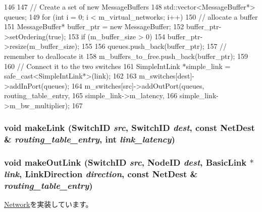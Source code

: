 \begin{DoxyCode}
146 {
147     // Create a set of new MessageBuffers
148     std::vector<MessageBuffer*> queues;
149     for (int i = 0; i < m_virtual_networks; i++) {
150         // allocate a buffer
151         MessageBuffer* buffer_ptr = new MessageBuffer;
152         buffer_ptr->setOrdering(true);
153         if (m_buffer_size > 0) {
154             buffer_ptr->resize(m_buffer_size);
155         }
156         queues.push_back(buffer_ptr);
157         // remember to deallocate it
158         m_buffers_to_free.push_back(buffer_ptr);
159     }
160     // Connect it to the two switches
161     SimpleIntLink *simple_link = safe_cast<SimpleIntLink*>(link);
162 
163     m_switches[dest]->addInPort(queues);
164     m_switches[src]->addOutPort(queues, routing_table_entry,
165                                          simple_link->m_latency, 
166                                          simple_link->m_bw_multiplier);
167 }
\end{DoxyCode}
\hypertarget{classSimpleNetwork_adbadd4382922414e5feb364d39cf9efe}{
\subsubsection[{makeLink}]{\setlength{\rightskip}{0pt plus 5cm}void makeLink ({\bf SwitchID} {\em src}, \/  {\bf SwitchID} {\em dest}, \/  const {\bf NetDest} \& {\em routing\_\-table\_\-entry}, \/  int {\em link\_\-latency})}}
\label{classSimpleNetwork_adbadd4382922414e5feb364d39cf9efe}
\hypertarget{classSimpleNetwork_a87915d87a2b4c11ae5f0f4da31bd2375}{
\subsubsection[{makeOutLink}]{\setlength{\rightskip}{0pt plus 5cm}void makeOutLink ({\bf SwitchID} {\em src}, \/  {\bf NodeID} {\em dest}, \/  {\bf BasicLink} $\ast$ {\em link}, \/  LinkDirection {\em direction}, \/  const {\bf NetDest} \& {\em routing\_\-table\_\-entry})}}
\label{classSimpleNetwork_a87915d87a2b4c11ae5f0f4da31bd2375}


\hyperlink{classNetwork_a4e62c2a0e4a511dae2e9870a3d305719}{Network}を実装しています。


